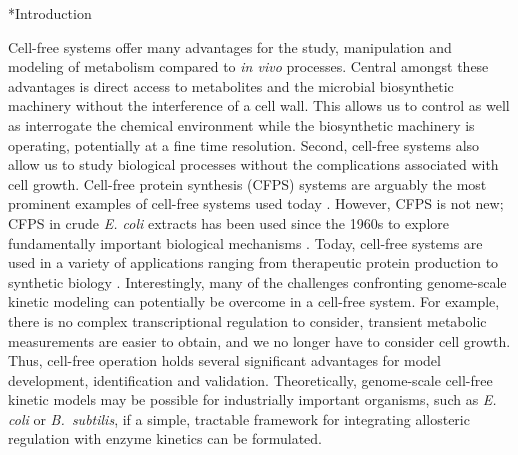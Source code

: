 \documentclass[12pt]{article}
\makeatletter
\renewcommand\section{\@startsection
	{subsection}{2}{0mm}
	{-0.2in}
	{0.05\baselineskip}
	{\normalfont\large\bfseries}}
\makeatother
\begin{document}
\linenumbers


\section*{Introduction}

Cell-free systems offer many advantages for the study, manipulation and modeling of metabolism compared to \textit{in vivo} processes.
Central amongst these advantages is direct access to metabolites and the microbial biosynthetic machinery without the interference of a cell wall.
This allows us to control as well as interrogate the chemical environment while the biosynthetic machinery is operating, potentially at a fine time resolution.
Second, cell-free systems also allow us to study biological processes without the complications associated with cell growth.
Cell-free protein synthesis (CFPS) systems are arguably the most prominent examples of cell-free systems used today \citep{Jewett:2008aa}.
However, CFPS is not new; CFPS in crude \textit{E. coli} extracts has been used since the 1960s to explore fundamentally important biological mechanisms \citep{MATTHAEI:1961aa,NIRENBERG:1961aa}.
Today, cell-free systems are used in a variety of applications ranging from therapeutic protein production \citep{Lu:2014aa} to synthetic biology \citep{Hodgman:2012aa}.
Interestingly, many of the challenges confronting genome-scale kinetic modeling can potentially be overcome in a cell-free system.
For example, there is no complex transcriptional regulation to consider, transient metabolic measurements are easier to obtain, and we no longer have to consider cell growth.
Thus, cell-free operation holds several significant advantages for model development, identification and validation. Theoretically, genome-scale cell-free kinetic models may be possible for industrially important organisms,
such as \textit{E. coli} or \textit{B.~subtilis}, if a simple, tractable framework for integrating allosteric regulation with enzyme kinetics can be formulated.
\end{document}
